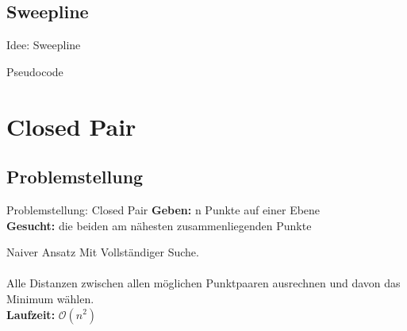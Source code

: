 \documentclass[18pt]{beamer}
\begin{document}
	\subsection{Sweepline}
		\begin{frame}{Idee: Sweepline}
	
		\end{frame}
	
		\begin{frame}{Pseudocode}
	
		\end{frame}
	
\section{Closed Pair}

	\subsection{Problemstellung}
		\begin{frame}{Problemstellung: Closed Pair}
			\textbf{Geben:} n Punkte auf einer Ebene \\
			\textbf{Gesucht:} die beiden am nähesten zusammenliegenden Punkte\\
		
			\begin{block}{Naiver Ansatz}
				Mit Vollständiger Suche. \\
				\ \\
				Alle Distanzen zwischen allen möglichen Punktpaaren ausrechnen und davon das Minimum wählen. 
				\ \\
				\textbf{Laufzeit:} $\mathcal{O}(n^2)$
			\end{block}	
		\end{frame}
	
\end{document}
